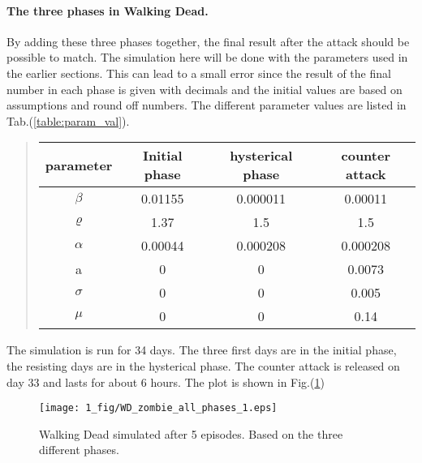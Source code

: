 \documentclass[%
twoside,                 %
final,                   %
chapterprefix=true,      %
open=right               %
10pt]{book}
\begin{document}
\paragraph{The three phases in Walking Dead.}
By adding these three phases together, the final result after the attack should be possible to match. The simulation here will be done with the parameters used in the earlier sections. This can lead to a small error since the result of the final number in each phase is given with decimals and the initial values are based on assumptions and round off numbers. The different parameter values are listed in Tab.(\ref{table:param_val}). 

\label{table:param_val}

\begin{quote}
\begin{tabular}{cccc}
\hline
\multicolumn{1}{c}{ parameter } & \multicolumn{1}{c}{ Initial phase } & \multicolumn{1}{c}{ hysterical phase } & \multicolumn{1}{c}{ counter attack } \\
\hline
$\beta$          & 0.01155          & 0.000011         & 0.00011          \\
$\varrho$        & 1.37             & 1.5              & 1.5              \\
$\alpha$         & 0.00044          & 0.000208         & 0.000208         \\
a                & 0                & 0                & 0.0073           \\
$\sigma$         & 0                & 0                & 0.005            \\
$\mu$            & 0                & 0                & 0.14             \\
\hline
\end{tabular}
\end{quote}

\noindent
The simulation is run for 34 days. The three first days are in the initial phase, the resisting days are in the hysterical phase. The counter attack is released on day 33 and lasts for about 6 hours. The plot is shown in Fig.(\ref{fig:all_phases})   


\begin{figure}[ht]
  \centerline{\texttt{[image: 1\_fig/WD\_zombie\_all\_phases\_1.eps]}}
  \caption{
  \label{fig:all_phases} Walking Dead simulated after 5 episodes. Based on the three different phases.
  }
\end{figure}
\end{document}
